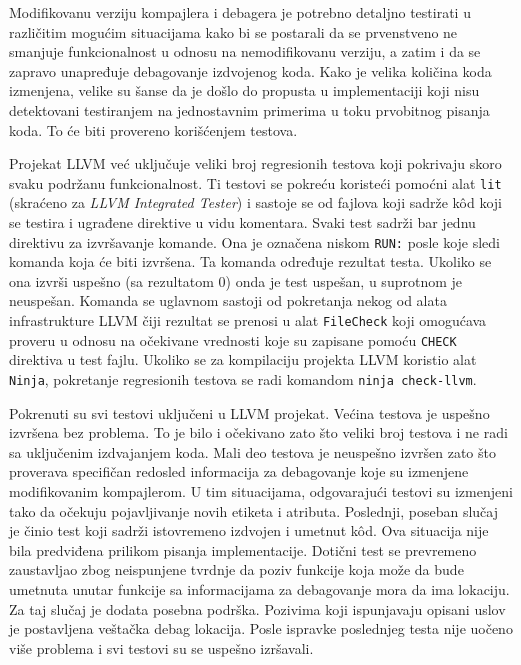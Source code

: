 \documentclass[12pt,oneside]{memoir}
\begin{document}
Modifikovanu verziju kompajlera i debagera je potrebno detaljno testirati u različitim mogućim situacijama kako bi se postarali da se prvenstveno ne smanjuje funkcionalnost u odnosu na nemodifikovanu verziju, a zatim i da se zapravo unapređuje debagovanje izdvojenog koda.
Kako je velika količina koda izmenjena, velike su šanse da je došlo do propusta u implementaciji koji nisu detektovani testiranjem na jednostavnim primerima u toku prvobitnog pisanja koda.
To će biti provereno korišćenjem testova.

Projekat LLVM već uključuje veliki broj regresionih testova koji pokrivaju skoro svaku podržanu funkcionalnost.
Ti testovi se pokreću koristeći pomoćni alat \verb|lit| (skraćeno za {\em LLVM Integrated Tester}) i sastoje se od fajlova koji sadrže k\^od koji se testira i ugrađene direktive u vidu komentara.
Svaki test sadrži bar jednu direktivu za izvršavanje komande. Ona je označena niskom \verb|RUN:| posle koje sledi komanda koja će biti izvršena.
Ta komanda određuje rezultat testa. Ukoliko se ona izvrši uspešno (sa rezultatom 0) onda je test uspešan, u suprotnom je neuspešan.
Komanda se uglavnom sastoji od pokretanja nekog od alata infrastrukture LLVM čiji rezultat se prenosi u alat \verb|FileCheck| koji omogućava proveru u odnosu na očekivane vrednosti koje su zapisane pomoću \verb|CHECK| direktiva u test fajlu. 
Ukoliko se za kompilaciju projekta LLVM koristio alat \verb|Ninja|, pokretanje regresionih testova se radi komandom \verb|ninja check-llvm|.

Pokrenuti su svi testovi uključeni u LLVM projekat. %
Većina testova je uspešno izvršena bez problema. To je bilo i očekivano zato što veliki broj testova i ne radi sa uključenim izdvajanjem koda.
Mali deo testova je neuspešno izvršen zato što proverava specifičan redosled informacija za debagovanje koje su izmenjene modifikovanim kompajlerom.
U tim situacijama, odgovarajući testovi su izmenjeni tako da očekuju pojavljivanje novih etiketa i atributa.
Poslednji, poseban slučaj je činio test koji sadrži istovremeno izdvojen i umetnut k\^od.
Ova situacija nije bila predviđena prilikom pisanja implementacije.
Dotični test se prevremeno zaustavljao zbog neispunjene tvrdnje da poziv funkcije koja može da bude umetnuta unutar funkcije sa informacijama za debagovanje mora da ima lokaciju.
Za taj slučaj je dodata posebna podrška.
Pozivima koji ispunjavaju opisani uslov je postavljena veštačka debag lokacija.
Posle ispravke poslednjeg testa nije uočeno više problema i svi testovi su se uspešno izršavali.
\end{document}
